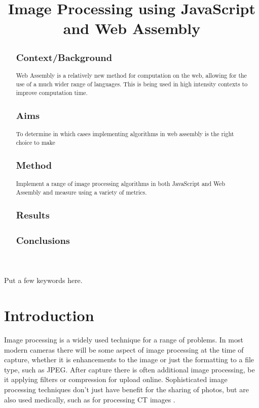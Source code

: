 \documentclass[12pt,a4paper]{article}
\title{Image Processing using JavaScript and Web Assembly}
\author{} %
\date{}
\begin{document}
\maketitle

\begin{abstract}
    \subsection{Context/Background}
    Web Assembly is a relatively new method for computation on the web, allowing for the use of a much wider range of languages. This is being used in high intensity contexts to improve computation time.

    \subsection{Aims}

    To determine in which cases implementing algorithms in web assembly is the right choice to make

    \subsection{Method}

    Implement a range of image processing algorithms in both JavaScript and Web Assembly and measure using a variety of metrics.

    \subsection{Results}

    \subsection{Conclusions}
\end{abstract}

\begin{keywords}
    Put a few keywords here.
\end{keywords}

\newpage

\section{Introduction}

Image processing is a widely used technique for a range of problems. In most modern cameras there will be some aspect of image processing at the time of capture, whether it is enhancements to the image or just the formatting to a file type, such as JPEG. After capture there is often additional image processing, be it applying filters or compression for upload online. Sophisticated image processing techniques don't just have benefit for the sharing of photos, but are also used medically, such as for processing CT images \cite{zhang2017applications}.
\end{document}
